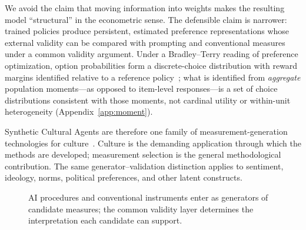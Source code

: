 \documentclass[10pt,letterpaper]{article}
\newcommand{\GPS}{\textsc{gps}}
\newcommand{\Rset}{\mathcal{R}}
\begin{document}
We avoid the claim that moving information into weights makes the resulting model ``structural'' in the econometric sense.
The defensible claim is narrower: trained policies produce persistent, estimated preference representations whose external validity can be compared with prompting and conventional measures under a common validity argument.
Under a Bradley--Terry reading of preference optimization, option probabilities form a discrete-choice distribution with reward margins identified relative to a reference policy~\cite{bradley1952,rafailov2023}; what is identified from \emph{aggregate} population moments---as opposed to item-level responses---is a set of choice distributions consistent with those moments, not cardinal utility or within-unit heterogeneity (Appendix~\ref{app:moment}).

Synthetic Cultural Agents are therefore one family of measurement-generation technologies for culture~\cite{capra2025}.
Culture is the demanding application through which the methods are developed; measurement selection is the general methodological contribution.
The same generator--validation distinction applies to sentiment, ideology, norms, political preferences, and other latent constructs.

\begin{figure}[t]
\centering
{}
\caption{AI procedures and conventional instruments enter as generators of candidate measures; the common validity layer determines the interpretation each candidate can support.}
\label{fig:generator}
\end{figure}
\end{document}
